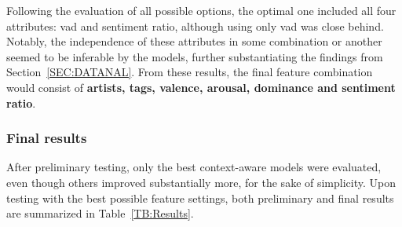 Following the evaluation of all possible options, the optimal one included all four attributes: \acs{vad} and sentiment ratio, although using only \acs{vad} was close behind. Notably, the independence of these attributes in some combination or another seemed to be inferable by the models, further substantiating the findings from Section~\ref{SEC:DATANAL}. From these results, the final feature combination would consist of \textbf{artists, tags, valence, arousal, dominance and sentiment ratio}.

\subsubsection{Final results}

After preliminary testing, only the best context-aware models were evaluated, even though others improved substantially more, for the sake of simplicity. Upon testing with the best possible feature settings, both preliminary and final results are summarized in Table~\ref{TB:Results}.

